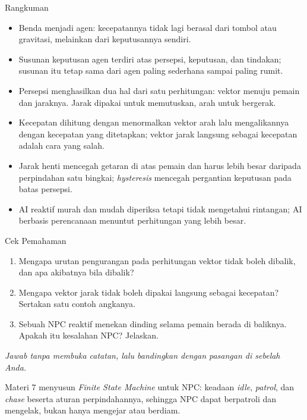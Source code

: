 \documentclass[aspectratio=169,10pt]{beamer}
\begin{document}
\begin{frame}{Rangkuman}
\begin{itemize}
  \item Benda menjadi agen: kecepatannya tidak lagi berasal dari tombol atau
        gravitasi, melainkan dari keputusannya sendiri.
  \item Susunan keputusan agen terdiri atas persepsi, keputusan, dan tindakan;
        susunan itu tetap sama dari agen paling sederhana sampai paling rumit.
  \item Persepsi menghasilkan dua hal dari satu perhitungan: vektor menuju
        pemain dan jaraknya. Jarak dipakai untuk memutuskan, arah untuk
        bergerak.
  \item Kecepatan dihitung dengan menormalkan vektor arah lalu mengalikannya
        dengan kecepatan yang ditetapkan; vektor jarak langsung sebagai
        kecepatan adalah cara yang salah.
  \item Jarak henti mencegah getaran di atas pemain dan harus lebih besar
        daripada perpindahan satu bingkai; \emph{hysteresis} mencegah
        pergantian keputusan pada batas persepsi.
  \item AI reaktif murah dan mudah diperiksa tetapi tidak mengetahui rintangan;
        AI berbasis perencanaan menuntut perhitungan yang lebih besar.
\end{itemize}
\end{frame}

\begin{frame}{Cek Pemahaman}
\begin{enumerate}
  \item Mengapa urutan pengurangan pada perhitungan vektor tidak boleh dibalik,
        dan apa akibatnya bila dibalik?
  \item Mengapa vektor jarak tidak boleh dipakai langsung sebagai kecepatan?
        Sertakan satu contoh angkanya.
  \item Sebuah NPC reaktif menekan dinding selama pemain berada di baliknya.
        Apakah itu kesalahan NPC? Jelaskan.
\end{enumerate}
\vspace{0.35cm}
{\footnotesize\color{ubMuted}\itshape Jawab tanpa membuka catatan, lalu
bandingkan dengan pasangan di sebelah Anda.}
\end{frame}

  {Materi 7 menyusun \emph{Finite State Machine} untuk NPC: keadaan
   \emph{idle}, \emph{patrol}, dan \emph{chase} beserta aturan perpindahannya,
   sehingga NPC dapat berpatroli dan mengelak, bukan hanya mengejar atau
   berdiam.}
\end{document}
